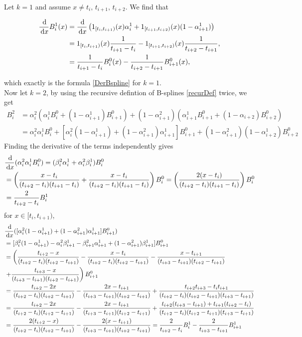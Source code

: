 Let $k=1$ and assume $x\neq t_i,\,t_{i+1},\,t_{i+2}$. We find that

\begin{align}
  \frac{\,{\rm d}}{\,{\rm d} x} B_i^1(x) &= \frac{\,{\rm d}}{\,{\rm d} x} \left(1_{[t_i,t_{i+1})}(x) \alpha_i^1 + 1_{[t_{i+1},t_{i+2})}(x) (1-\alpha_{i+1}^1)\right)\\
  &= 1_{[t_i,t_{i+1})}(x) \frac{1}{t_{i+1}-t_{i}} - 1_{[t_{i+1},t_{i+2})}(x) \frac{1}{t_{i+2}-t_{i+1}},\\
  &= \frac{1}{t_{i+1}-t_{i}}B_i^0(x) - \frac{1}{t_{i+2}-t_{i+1}} B_{i+1}^0(x),
\end{align}

which exactly is the formula \eqref{DerBspline} for $k=1$.\\

Now let $k=2$, by using the recursive defintion of B-splines \eqref{recurDef} twice, we get
\begin{align}
  B_i^2 &= \alpha_i^2(\alpha_i^1 B_i^0 + (1-\alpha_{i+1}^1)B_{i+1}^0) + (1-\alpha_{i+1}^2)(\alpha_{i+1}^1B_{i+1}^0 + (1-\alpha_{i+2})B_{i+2}^0)\\
  &= \alpha_i^2\alpha_i^1B_i^0 + [\alpha_i^2(1-\alpha_{i+1}^1) + (1-\alpha_{i+1}^2)\alpha_{i+1}^1]B_{i+1}^0 + (1-\alpha_{i+1}^2)(1-\alpha_{i+2}^1)B_{i+2}^0
\end{align}
Finding the derivative of the terms independently gives
\begin{align}
  &\frac{\,{\rm d}}{\,{\rm d} x} (\alpha_i^2\alpha_i^1B_i^0) = (\beta_i^2\alpha_i^1 + \alpha_i^2\beta_i^1)B_i^0\\
  &= \left(\frac{x-t_i}{(t_{i+2}-t_i)(t_{i+1}-t_i)} + \frac{x-t_i}{(t_{i+2}-t_i)(t_{i+1}-t_i)}\right)B_i^0 = \left(\frac{2(x-t_i)}{(t_{i+2}-t_i)(t_{i+1}-t_i)}\right)B_i^0\\
  & = \frac{2}{t_{i+2}-t_i}B_i^1
\end{align}
for $x\in [t_i,t_{i+1})$, 
\begin{align}
  &\frac{\,{\rm d}}{\,{\rm d} x} ([\alpha_i^2(1-\alpha_{i+1}^1) + (1-\alpha_{i+1}^2)\alpha_{i+1}^1]B_{i+1}^0)\\
  &= [\beta_i^2(1-\alpha_{i+1}^1) - \alpha_i^2\beta_{i+1}^1 - \beta_{i+1}^2\alpha_{i+1}^1 + (1-\alpha_{i+1}^2)\beta_{i+1}^1]B_{i+1}^0\\
  &= \left(\frac{t_{i+2}-x}{(t_{i+2}-t_i)(t_{i+2}-t_{i+1})}-\frac{x-t_i}{(t_{i+2}-t_i)(t_{i+2}-t_{i+1})} - \frac{x-t_{i+1}}{(t_{i+3}-t_{i+1})(t_{i+2}-t_{i+1})}\right.\\
  &\left.+ \frac{t_{i+3}-x}{(t_{i+3}-t_{i+1})(t_{i+2}-t_{i+1})}\right)B_{i+1}^0\\ 
  &= \frac{t_{i+2}-2x}{(t_{i+2}-t_i)(t_{i+2}-t_{i+1})}-\frac{2x-t_{i+1}}{(t_{i+3}-t_{i+1})(t_{i+2}-t_{i+1})} + \frac{t_{i+2}t_{i+3}-t_it_{i+1}}{(t_{i+2}-t_i)(t_{i+2}-t_{i+1})(t_{i+3}-t_{i+1})}\\
  &= \frac{t_{i+2}-2x}{(t_{i+2}-t_i)(t_{i+2}-t_{i+1})}-\frac{2x-t_{i+1}}{(t_{i+3}-t_{i+1})(t_{i+2}-t_{i+1})} + \frac{t_{i+2}(t_{i+3}-t_{i+1}) + t_{i+1}(t_{i+2}-t_i)}{(t_{i+2}-t_i)(t_{i+2}-t_{i+1})(t_{i+3}-t_{i+1})}\\
  &= \frac{2(t_{i+2}-x)}{(t_{i+2}-t_i)(t_{i+2}-t_{i+1})}-\frac{2(x-t_{i+1})}{(t_{i+3}-t_{i+1})(t_{i+2}-t_{i+1})} = \frac{2}{t_{i+2}-t_i} B_i^1 - \frac{2}{t_{i+3}-t_{i+1}} B_{i+1}^1 
\end{align}
